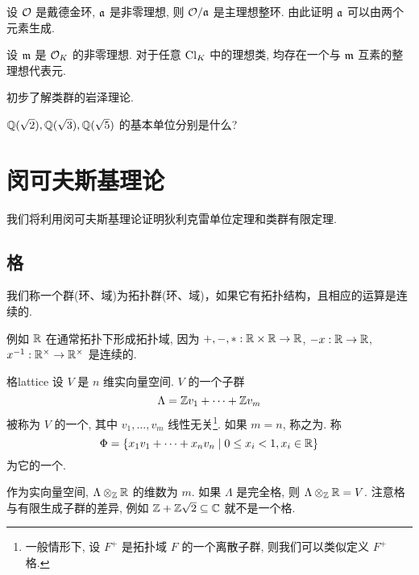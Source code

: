 \begin{exercise}
设 ${\mathcal{O}}$ 是戴德金环, ${\mathfrak{a}}$ 是非零理想, 则 ${\mathcal{O}}/{\mathfrak{a}}$ 是主理想整环. 由此证明 ${\mathfrak{a}}$ 可以由两个元素生成.
\end{exercise}

\begin{exercise}
设 ${\mathfrak{m}}$ 是 ${\mathcal{O}}_K$ 的非零理想. 对于任意 ${\mathrm{Cl}}_K$ 中的理想类, 均存在一个与 ${\mathfrak{m}}$ 互素的整理想代表元.
\end{exercise}

\begin{exercise}
初步了解类群的岩泽理论.
\end{exercise}


\begin{exercise}
${\mathbb{Q}}(\sqrt{2}), {\mathbb{Q}}(\sqrt{3}), {\mathbb{Q}}(\sqrt{5})$ 的基本单位分别是什么?
\end{exercise}



\section{闵可夫斯基理论}
我们将利用闵可夫斯基理论证明狄利克雷单位定理和类群有限定理.

\subsection{格}
我们称一个群(环、域)为拓扑群(环、域)，如果它有拓扑结构，且相应的运算是连续的.
\begin{example}
例如 ${\mathbb{R}}$ 在通常拓扑下形成拓扑域, 因为 $+,-,*:{\mathbb{R}}\times{\mathbb{R}}\to {\mathbb{R}}$, $-x:{\mathbb{R}}\to {\mathbb{R}}$, $x^{-1}:{\mathbb{R}}^\times\to {\mathbb{R}}^\times$ 是连续的.
\end{example}

\begin{definition}{格}{lattice}
设 $V$ 是 $n$ 维实向量空间. $V$ 的一个子群
  \[\Lambda={\mathbb{Z}} v_1+\dots+{\mathbb{Z}} v_m\]
被称为 $V$ 的一个, 其中 $v_1,\dots,v_m$ 线性无关\footnote{一般情形下, 设 $F^+$ 是拓扑域 $F$ 的一个离散子群, 则我们可以类似定义 $F^+$ 格.}. 如果 $m=n$, 称之为. 称
  \[\Phi=\left\{x_1 v_1+\dots+x_n v_n\mid 0\le x_i<1,x_i\in{\mathbb{R}}\right\}\]
为它的一个.
\end{definition}

作为实向量空间, $\Lambda\otimes_{\mathbb{Z}}{\mathbb{R}}$ 的维数为 $m$. 如果 $\Lambda$ 是完全格, 则 $\Lambda\otimes_{\mathbb{Z}}{\mathbb{R}}=V$. 注意格与有限生成子群的差异, 例如 ${\mathbb{Z}}+{\mathbb{Z}}\sqrt{2}\subseteq {\mathbb{C}}$ 就不是一个格.

